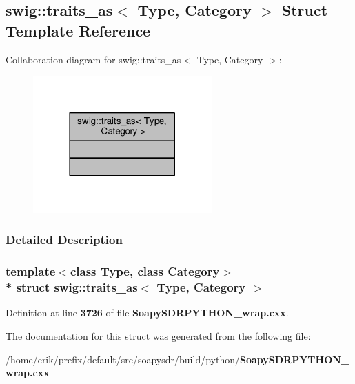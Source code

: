 \subsection{swig\+:\+:traits\+\_\+as$<$ Type, Category $>$ Struct Template Reference}
\label{structswig_1_1traits__as}


Collaboration diagram for swig\+:\+:traits\+\_\+as$<$ Type, Category $>$\+:
\nopagebreak
\begin{figure}[H]
\begin{center}
\leavevmode
\includegraphics[width=194pt]{de/d1b/structswig_1_1traits__as__coll__graph}
\end{center}
\end{figure}


\subsubsection{Detailed Description}
\subsubsection*{template$<$class Type, class Category$>$\\*
struct swig\+::traits\+\_\+as$<$ Type, Category $>$}



Definition at line {\bf 3726} of file {\bf Soapy\+S\+D\+R\+P\+Y\+T\+H\+O\+N\+\_\+wrap.\+cxx}.



The documentation for this struct was generated from the following file\+:\begin{DoxyCompactItemize}
\item 
/home/erik/prefix/default/src/soapysdr/build/python/{\bf Soapy\+S\+D\+R\+P\+Y\+T\+H\+O\+N\+\_\+wrap.\+cxx}\end{DoxyCompactItemize}
